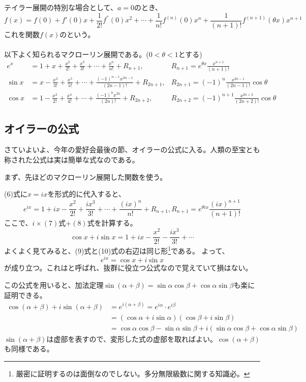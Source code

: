 \documentclass[a4j,dvipdfmx]{jsarticle}
\begin{document}
テイラー展開の特別な場合として、$a=0$のとき、
\begin{equation}
    f(x)=f(0)+f'(0)x+\frac{1}{2!}f^{''}(0)x^2+\cdots+\frac{1}{n!}f^{(n)}(0)x^n+\frac{1}{(n+1)!}f^{(n+1)}(\theta x)x^{n+1}
\end{equation}
これを関数$f(x)$のという。\\\\
以下よく知られるマクローリン展開である。($0<\theta<1$とする)
\begin{align}
    e^x&=1+x+\frac{x^2}{2!}+\frac{x^3}{3!}+\cdots+\frac{x^n}{n!}+R_{n+1},& R_{n+1}=e^{\theta x}\frac{x^{n+1}}{(n+1)!}\\
    \sin x&=x-\frac{x^3}{3!}+\frac{x^5}{5!}+\cdots+\frac{(-1)^{n-1}x^{2n-1}}{(2n-1)!}+R_{2n+1},& R_{2n+1}=(-1)^n\frac{x^{2n-1}}{(2n-1)!}\cos\theta\\
    \cos x&=1-\frac{x^2}{2!}+\frac{x^4}{4!}+\cdots+\frac{(-1)^{n}x^{2n}}{(2n)!}+R_{2n+2},& R_{2n+2}=(-1)^{n+1}\frac{x^{2n+2}}{(2n+2)!}\cos\theta
\end{align}
\subsection{オイラーの公式}
さていよいよ、今年の愛好会最後の節、オイラーの公式に入る。人類の至宝とも称された公式は実は簡単な式なのである。

まず、先ほどのマクローリン展開した関数を使う。

(6)式に$x=ix$を形式的に代入すると、
\begin{equation}
    e^{ix}=1+ix-\frac{x^2}{2!}+\frac{ix^3}{3!}+\cdots+\frac{({ix})^n}{n!}+R_{n+1},R_{n+1}=e^{\theta ix}\frac{({ix})^{n+1}}{(n+1)!}
\end{equation}
ここで、$i\times(7)$式$+(8)$式を計算する。
\begin{equation}
    \cos x+i\sin x=1+ix-\frac{x^2}{2!}-\frac{ix^3}{3!}+\cdots
\end{equation}
よくよく見てみると、(9)式と(10)式の右辺は同じ形\footnote{厳密に証明するのは面倒なのでしない。多分無限級数に関する知識必。}である。
よって、
\begin{equation}
    e^{ix}=\cos x+i\sin x
\end{equation}
が成り立つ。これはと呼ばれ、抜群に役立つ公式なので覚えていて損はない。

この公式を用いると、加法定理$\sin(\alpha+\beta)=\sin\alpha\cos\beta+\cos\alpha\sin\beta$も楽に証明できる。
\begin{align*}
    \cos(\alpha+\beta)+i\sin(\alpha+\beta)&=e^{i(\alpha+\beta)}=e^{i\alpha}\cdot e^{i\beta}\\
    &=(\cos \alpha+i\sin\alpha)(\cos \beta+i\sin\beta)\\
    &=\cos\alpha\cos\beta-\sin\alpha\sin\beta+i(\sin\alpha\cos\beta+\cos\alpha\sin\beta)
\end{align*}
$\sin(\alpha+\beta)$は虚部を表すので、変形した式の虚部を取ればよい。$\cos(\alpha+\beta)$も同様である。
\end{document}
